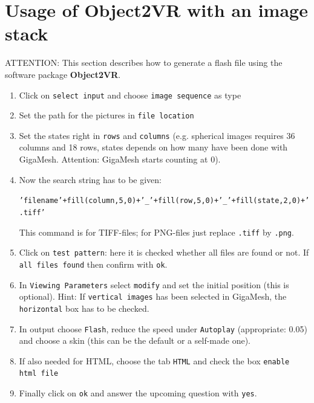 \section{Usage of Object2VR with an image stack}
ATTENTION: This section describes how to generate a flash file using the software package {\bf Object2VR}.
\begin{enumerate}
\item Click on \texttt{select input} and choose \texttt{image sequence} as type
\item Set the path for the pictures in \texttt{file location}
\item Set the states right in \texttt{rows} and \texttt{columns} (e.g. spherical images requires 36 columns and 18 rows, states depends on how many have been done with GigaMesh. Attention: GigaMesh starts counting at 0).
\item Now the search string has to be given: 

{\small \tt 'filename'+fill(column,5,0)+'\_'+fill(row,5,0)+'\_'+fill(state,2,0)+'.tiff'}

This command is for TIFF-files; for PNG-files just replace {\tt .tiff} by {\tt .png}.
\item Click on \texttt{test pattern}: here it is checked whether all files are found or not. If \texttt{all files found} then confirm with \texttt{ok}.
\item In \texttt{Viewing Parameters} select \texttt{modify} and set the initial position (this is optional). Hint: If \texttt{vertical images} has been selected in GigaMesh, the \texttt{horizontal} box has to be checked.
\item In output choose \texttt{Flash}, reduce the speed under \texttt{Autoplay} (appropriate: 0.05) and choose a skin (this can be the default or a self-made one).
\item If also needed for HTML, choose the tab \texttt{HTML} and check the box \texttt{enable html file}
\item Finally click on \texttt{ok} and answer the upcoming question with \texttt{yes}.
\end{enumerate}

